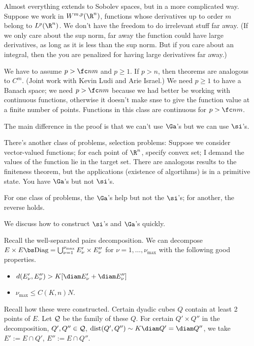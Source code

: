 
Almost everything extends to Sobolev spaces, but in a more complicated way. Suppose we work in $W^{m,p}(\R^n)$, functions whose derivatives up to order $m$ belong to $L^p(\R^n)$. 
We don't have the freedom to do irrelevant stuff far away. 
(If we only care about the sup norm, far away the function could have large derivatives, as long as it is less than the sup norm. But if you care about an integral, then the you are penalized for having large derivatives far away.)

We have to assume $p>\fc nm$ and $p\ge 1$. If $p>n$, then theorems are analogous to $C^m$. (Joint work with Kevin Ludi and Arie Israel.)
We need $p\ge 1$ to have a Banach space; we need $p>\fc nm$ because we had better be working with continuous functions, otherwise it doesn't make snse to give the function value at a finite number of points.  Functions in this class are continuous for $p>\fc nm$.

The main difference in the proof is that we can't use $\Ga$'s but we can use $\si$'s.

There's another class of problems, selection problems: Suppose we consider vector-valued functions; for each point of $\R^n$, specify convex set; I demand the values of the function lie in the target set.  There are analogous results to the finiteness theorem, but the applications (existence of algortihms) is in a primitive state. You have $\Ga$'s but not $\si$'s. 

For one class of problems, the $\Ga$'s help but not the $\si$'s; for another, the reverse holds.

We discuss how to construct $\si$'s and $\Ga$'s quickly.

Recall the well-separated pairs decomposition.
We can decompose
$E\times E\bs \text{Diag}=\bigcup_{\nu=1}^{\nu_{\max}}E_\nu' \times E_\nu''$ for $\nu=1,\ldots, \nu_{\max}$ with the following good properties. 
\begin{itemize}
\item
$d(E_\nu', E_{\nu}'')>K[\diam E_\nu' + \diam E_\nu'']$
\item
$\nu_{\max} \le C(K,n)N$. 
\end{itemize}
Recall how these were constructed. Certain dyadic cubes $Q$ contain at least 2 points of $E$.
Let $\cal Q$ be the family of these $Q$. 
For certain $Q'\times Q''$ in the decomposition, $Q',Q''\in \cal Q$, $\text{dist}(Q',Q'') \sim K \diam Q'=\diam Q''$, we take $E' := E\cap Q'$, $E'' := E\cap Q''$.

